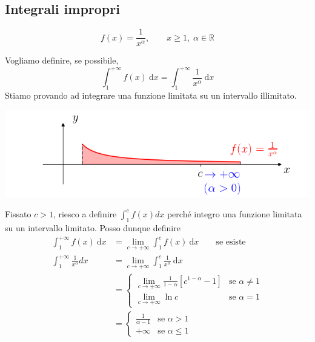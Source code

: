 \subsection{Integrali impropri}
\begin{exbar}
\begin{example}
	\begin{equation*}
		f(x)=\frac{1}{x^\alpha}, \qquad x \geq 1, \; \alpha \in \mathbb{R}
	\end{equation*}
	
	Vogliamo definire, se possibile, 
	\begin{equation*}
		\int_{1}^{+\infty} f(x) \ \mathrm{d}x= \int_{1}^{+\infty}\frac{1}{x^\alpha} \ \mathrm{d}x
	\end{equation*}
	Stiamo provando ad integrare una funzione limitata su un intervallo illimitato.
	\begin{center}
		\includegraphics[width=\linewidth]{integrali_impropri/pag77}
		\label{fig:pag77}
	\end{center}

	Fissato $c > 1$, riesco a definire $\int_{1}^{c} f(x)dx$ perché integro una funzione limitata su un intervallo limitato. Posso dunque definire
	\begin{align*}
		\int_{1}^{+\infty} f(x) \ \mathrm{d}x 
		&= \lim_{c\rightarrow +\infty} \int_{1}^{c}f(x) \ \mathrm{d}x \qquad \text{se esiste}
		\\
		\int_{1}^{+\infty} \frac{1}{x^\alpha} dx 
		&= \lim_{c \rightarrow + \infty} \int_{1}^{c} \frac{1}{x^\alpha} \ \mathrm{d} x 
		\\
		&=
		\begin{cases}
			\lim_{c \rightarrow +\infty}\frac{1}{1-\alpha}[c^{1-\alpha}-1] & \text{se } \alpha \neq 1
			\\[1em]
			\lim_{c \rightarrow +\infty} \ln c & \text{se } \alpha=1
		\end{cases}
		\\
		&=
		\begin{cases}
			 \frac{1}{\alpha-1} & \text{se } \alpha > 1
			\\[1em]
			+\infty & \text{se } \alpha \leq 1
		\end{cases}
	\end{align*}
\end{example}
\end{exbar}

